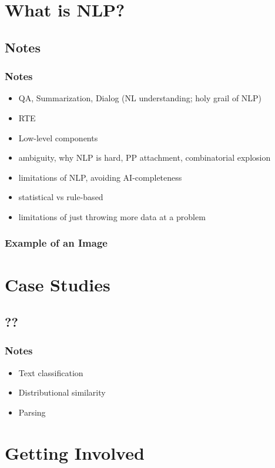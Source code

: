 \documentclass{beamer}             %
\begin{document}

\section{What is NLP?}

\subsection{Notes}

\begin{frame}
  \frametitle{Notes}
  \begin{itemize}
    \item QA, Summarization, Dialog (NL understanding; holy grail of NLP)
    \item RTE
    \item Low-level components
    \item ambiguity, why NLP is hard, PP attachment, combinatorial explosion
    \item limitations of NLP, avoiding AI-completeness
    \item statistical vs rule-based
    \item limitations of just throwing more data at a problem
  \end{itemize}
\end{frame}

\begin{frame}
  \frametitle{Example of an Image}
\end{frame}


\section{Case Studies}

\subsection{??}

\begin{frame}
  \frametitle{Notes}
  \begin{itemize}
    \item Text classification
    \item Distributional similarity
    \item Parsing
  \end{itemize}
\end{frame}


\section{Getting Involved}

\end{document}
